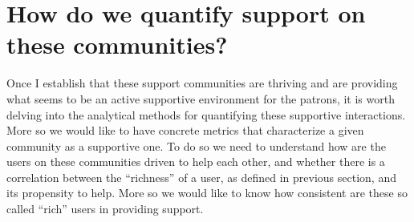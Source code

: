 

\section{How do we quantify support on these communities?}
\label{sec:support}
Once I establish that these support communities are thriving and are providing what seems to be an active supportive environment for the patrons, it is worth delving into the analytical methods for quantifying these supportive interactions. More so we would like to have concrete metrics that characterize a given community as a supportive one. To do so we need to understand how are the users on these communities driven to help each other, and whether there is a correlation between the ``richness'' of a user, as defined in previous section, and its propensity to help. More so we would like to know how consistent are these so called ``rich'' users in providing support. 

